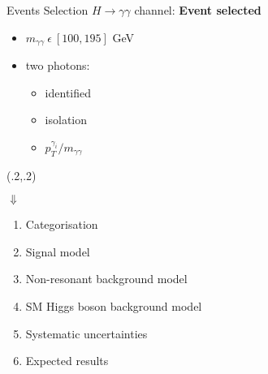 \documentclass[10pt,UKenglish, leqno, xcolor = dvipsnames]{beamer}
\begin{document}
	\begin{frame}{Events Selection}
		\vfill
		$H \to \gamma\gamma$ channel: \textbf{Event selected}
		\begin{itemize}
			\item $m_{\gamma\gamma}\ \epsilon\ [100,195]$ GeV
			\item two photons:
			\begin{itemize}
				\item identified
				\item isolation
				\item $p_T^{\gamma_i}/m_{\gamma\gamma}$
			\end{itemize}
		\end{itemize}
		\begin{textblock}{1}(.2,.2)
			\begin{table}[tbp]
				\centering
			\end{table}
		\end{textblock}
		\vspace{.5cm}
		\centering
		$\Downarrow$
		\begin{enumerate}\centering
			\item Categorisation
			\item Signal model
			\item Non-resonant background model
			\item SM Higgs boson background model
			\item Systematic uncertainties
			\item Expected results
		\end{enumerate}
		\vfill
	\end{frame}
	
\end{document}
